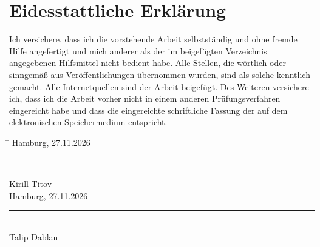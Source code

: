 \documentclass[a4paper,titlepage]{article}
\numberwithin{equation}{section} %
\begin{document}
\section*{Eidesstattliche Erklärung}

\glqq Ich versichere, dass ich die vorstehende Arbeit selbstständig und
ohne fremde Hilfe angefertigt und mich anderer als der im beigefügten
Verzeichnis angegebenen Hilfsmittel nicht bedient habe. Alle Stellen, die
wörtlich oder sinngemäß aus Veröffentlichungen übernommen wurden, sind als
solche kenntlich gemacht. Alle Internetquellen sind der Arbeit beigefügt.
Des Weiteren versichere ich, dass ich die Arbeit vorher nicht in einem anderen
Prüfungsverfahren eingereicht habe und dass die eingereichte schriftliche Fassung
der auf dem elektronischen Speichermedium entspricht.\grqq
~\\[15mm]
\begin{tabbing}
\hspace*{6cm}\=\kill
Hamburg, 27.11.2026 \> \rule{6cm}{0.4pt}\\
                    \> Kirill Titov\\[15mm]
Hamburg, 27.11.2026 \> \rule{6cm}{0.4pt}\\
                    \> Talip Dablan
\end{tabbing}
\end{document}
